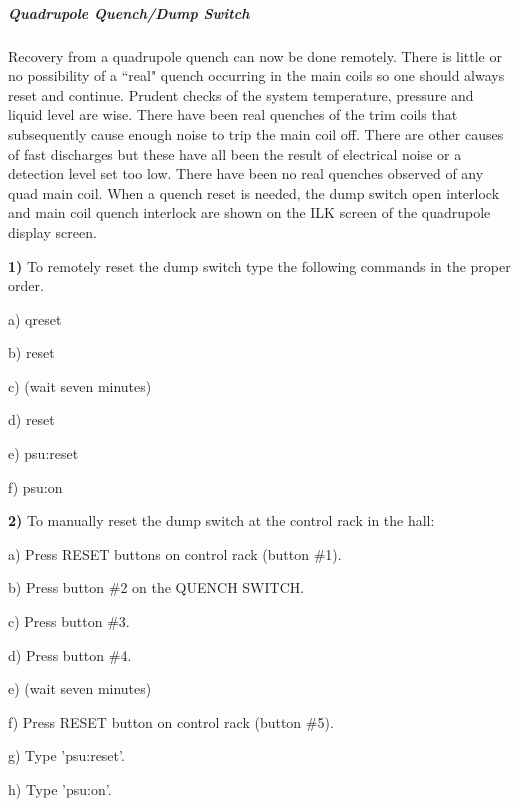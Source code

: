 \subparagraph{Quadrupole Quench/Dump Switch}
\begin{description}
\item{}\hskip0.3in Recovery from a quadrupole quench can now be done
remotely.   There is little or no
possibility of a ``real" quench occurring in the main coils so one should
always reset and continue.  Prudent checks of the system temperature,
pressure and liquid level are wise.  There have been real quenches of
the trim coils that subsequently cause enough noise to trip the main
coil off.  There are other causes of fast discharges but these have all
been the result of electrical noise or a detection level set too low.
There have been no real quenches observed of any quad main coil.
When a quench reset is needed, the dump switch open interlock and
main coil quench interlock are shown on the ILK screen of the
quadrupole display screen.
\end{description}

\begin{description}
\item{\hskip0.3in \bf 1)}\hskip0.1in To remotely reset the dump
switch type the following commands in the proper order.
\end{description}

\begin{description}
\item{}\hskip0.5in a) qreset
\item{}\hskip0.5in b) reset
\item{}\hskip0.5in c) (wait seven minutes)
\item{}\hskip0.5in d) reset
\item{}\hskip0.5in e) psu:reset
\item{}\hskip0.5in f) psu:on
\end{description}

\begin{description}
\item{\hskip0.3in \bf 2)}\hskip0.1in To manually reset the dump
switch at the control rack in the hall:
\end{description}

\begin{description}
\item{}\hskip0.5in a) Press RESET buttons on control rack (button \#1).
\item{}\hskip0.5in b) Press button \#2 on the QUENCH SWITCH.
\item{}\hskip0.5in c) Press button \#3.
\item{}\hskip0.5in d) Press button \#4.
\item{}\hskip0.5in e) (wait seven minutes)
\item{}\hskip0.5in f) Press RESET button on control rack (button \#5).
\item{}\hskip0.5in g) Type 'psu:reset'.
\item{}\hskip0.5in h) Type 'psu:on'.
\end{description}

